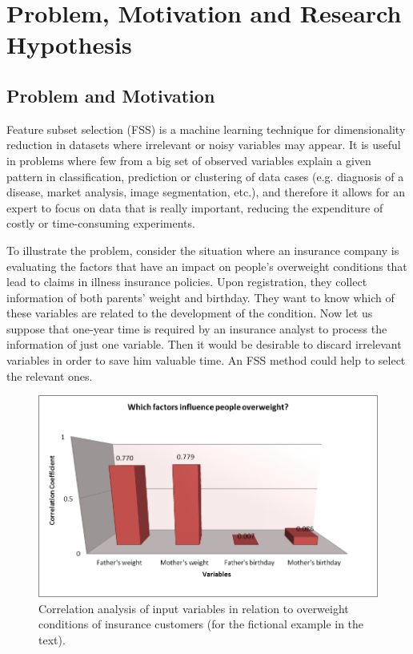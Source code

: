 \section{Problem, Motivation and Research Hypothesis}
\subsection{Problem and Motivation}
\label{sec:formulation}

Feature subset selection (FSS) is a machine learning technique for dimensionality reduction in datasets where irrelevant or noisy variables may appear. It is useful in problems where few from a big set of observed variables explain a given pattern in classification, prediction or clustering of data cases (e.g. diagnosis of a disease, market analysis, image segmentation, etc.), and therefore it allows for an expert to focus on data that is really important, reducing the expenditure of costly or time-consuming experiments.  

To illustrate the problem, consider the situation where an insurance company is evaluating the factors that have an impact on people's overweight conditions that lead to claims in illness insurance policies. Upon registration, they collect information of both parents' weight and birthday. They want to know which of these variables are related to the development of the condition. Now let us suppose that one-year time is required by an insurance analyst to process the information of just one variable. Then it would be desirable to discard irrelevant variables in order to save him valuable time. An FSS method could help to select the relevant ones.

\begin{figure}[h]
	\centering
		\includegraphics{Images/example01}
	\caption[Correlation analysis of input variables in relation to overweight conditions of insurance customers.]%
	{Correlation analysis of input variables in relation to overweight conditions of insurance customers (for the fictional example in the text).}
	\label{fig:im01}
\end{figure}

